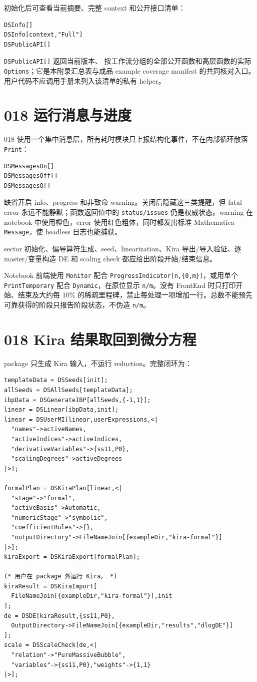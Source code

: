 ﻿\documentclass[a4paper,11pt]{article}
\begin{document}
初始化后可查看当前摘要、完整 context 和公开接口清单：
\begin{verbatim}
DSInfo[]
DSInfo[context,"Full"]
DSPublicAPI[]
\end{verbatim}
\texttt{DSPublicAPI[]} 返回当前版本、
按工作流分组的全部公开函数和高层函数的实际 \texttt{Options}；它是本附录汇总表与成品
example coverage manifest 的共同核对入口。用户代码不应调用手册未列入该清单的私有 helper。

\section{018 运行消息与进度}

018 使用一个集中消息层，所有耗时模块只上报结构化事件，不在内部循环散落 \texttt{Print}：
\begin{verbatim}
DSMessagesOn[]
DSMessagesOff[]
DSMessagesQ[]
\end{verbatim}
缺省开启 info、progress 和非致命 warning。关闭后隐藏这三类提醒，但 fatal error 永远不能静默；函数返回值中的 \texttt{status/issues} 仍是权威状态。warning 在 notebook 中使用橙色，error 使用红色粗体，同时都发出标准 Mathematica \texttt{Message}，使 headless 日志也能捕获。

sector 初始化、偏导算符生成、seed、linearization、Kira 导出/导入验证、逐 master/变量构造 DE 和 scaling check 都应给出阶段开始/结束信息。

Notebook 前端使用 \texttt{Monitor} 配合 \texttt{ProgressIndicator[n,\{0,m\}]}，或用单个 \texttt{PrintTemporary} 配合 \texttt{Dynamic}，在原位显示 \texttt{n/m}。没有 FrontEnd 时只打印开始、结束及大约每 $10\%$ 的稀疏里程碑，禁止每处理一项增加一行。总数不能预先可靠获得的阶段只报告阶段状态，不伪造 \texttt{n/m}。

\section{018 Kira 结果取回到微分方程}

package 只生成 Kira 输入，不运行 reduction。完整闭环为：
\begin{verbatim}
templateData = DSSeeds[init];
allSeeds = DSAllSeeds[templateData];
ibpData = DSGenerateIBP[allSeeds,{-1,1}];
linear = DSLinear[ibpData,init];
linear = DSUserMI[linear,userExpressions,<|
  "names"->activeNames,
  "activeIndices"->activeIndices,
  "derivativeVariables"->{ss11,P0},
  "scalingDegrees"->activeDegrees
|>];

formalPlan = DSKiraPlan[linear,<|
  "stage"->"formal",
  "activeBasis"->Automatic,
  "numericStage"->"symbolic",
  "coefficientRules"->{},
  "outputDirectory"->FileNameJoin[{exampleDir,"kira-formal"}]
|>];
kiraExport = DSKiraExport[formalPlan];

(* 用户在 package 外运行 Kira。 *)
kiraResult = DSKiraImport[
  FileNameJoin[{exampleDir,"kira-formal"}],init
];
de = DSDE[kiraResult,{ss11,P0},
  OutputDirectory->FileNameJoin[{exampleDir,"results","dlogDE"}]
];
scale = DSScaleCheck[de,<|
  "relation"->"PureMassiveBubble",
  "variables"->{ss11,P0},"weights"->{1,1}
|>];
\end{verbatim}
\end{document}
